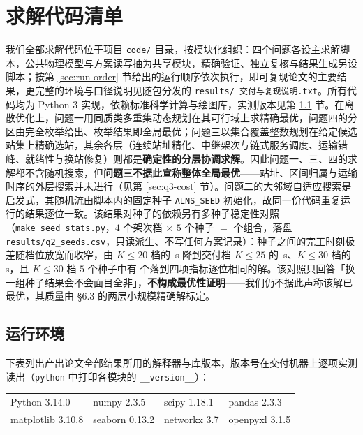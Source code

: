 \section{求解代码清单}

我们全部求解代码位于项目 \texttt{code/} 目录，按模块化组织：四个问题各设主求解脚本，公共物理模型与方案读写抽为共享模块，精确验证、独立复核与结果生成另设脚本；按第 \ref{sec:run-order} 节给出的运行顺序依次执行，即可复现论文的主要结果，更完整的环境与口径说明见随包分发的 \texttt{results/\_交付与复现说明.txt}。所有代码均为 Python 3 实现，依赖标准科学计算与绘图库，实测版本见第 \ref{sec:run-env} 节。在离散优化上，问题一用同质类多重集动态规划在其可行域上求精确最优，问题四的分区由完全枚举给出、枚举结果即全局最优；问题三以集合覆盖整数规划在给定候选站集上精确选站，其余各层（连续站址精化、中继架次与链式服务调度、运输错峰、就绪性与换站修复）则都是\textbf{确定性的分层协调求解}。因此问题一、三、四的求解都不含随机搜索，但\textbf{问题三不据此宣称整体全局最优}——站址、区间归属与运输时序的外层搜索并未进行（见第 \ref{sec:q3-cost} 节）。问题二的大邻域自适应搜索是启发式，其随机流由脚本内的固定种子 \texttt{ALNS\_SEED} 初始化，故同一份代码重复运行的结果逐位一致。该结果对种子的依赖另有多种子稳定性对照（\texttt{make\_seed\_stats.py}，$4$ 个架次档 $\times$ $5$ 个种子 $=$ \mtQtwoSeedRuns 个组合，落盘 \texttt{results/q2\_seeds.csv}，只读派生、不写任何方案记录）：种子之间的完工时刻极差随档位放宽而收窄，由 $K\le20$ 档的 \mtQtwoSeedSpreadKTwenty\,s 降到交付档 $K\le25$ 的 \mtQtwoSeedSpreadKTwentyFive\,s、$K\le30$ 档的 \mtQtwoSeedSpreadKThirty\,s，且 $K\le30$ 档 $5$ 个种子中有 \mtQtwoSeedSameKThirty 个落到四项指标逐位相同的解。该对照只回答「换一组种子结果会不会面目全非」，\textbf{不构成最优性证明}——我们仍不据此声称该解已最优，其质量由 §6.3 的两层小规模精确解标定。

\subsection{运行环境}
\label{sec:run-env}

下表列出产出论文全部结果所用的解释器与库版本，版本号在交付机器上逐项实测读出（\texttt{python} 中打印各模块的 \texttt{\_\_version\_\_}）：

\begin{center}
	\begin{tabular}{llll}
		\toprule
		Python 3.14.0 & numpy 2.3.5 & scipy 1.18.1 & pandas 2.3.3 \\
		matplotlib 3.10.8 & seaborn 0.13.2 & networkx 3.7 & openpyxl 3.1.5 \\
		\bottomrule
	\end{tabular}
\end{center}

